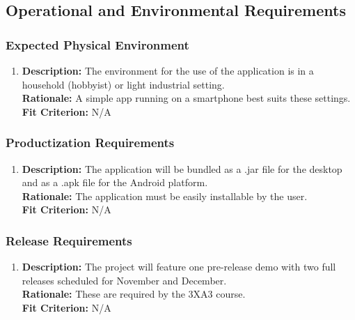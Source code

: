 \documentclass{article}
\begin{document}
\subsection{Operational and Environmental Requirements}
\subsubsection{Expected Physical Environment}
\begin{enumerate}
\item \textbf{Description: } The environment for the use of the application is in a household (hobbyist) or light industrial setting.
\\ \textbf{Rationale: } A simple app running on a smartphone best suits these settings.
\\ \textbf{Fit Criterion:} N/A
\end{enumerate}

\subsubsection{Productization Requirements}
\begin{enumerate}
\item \textbf{Description: } The application will be bundled as a .jar file for the desktop and as a .apk file for the Android platform.
\\ \textbf{Rationale: } The application must be easily installable by the user.
\\ \textbf{Fit Criterion:} N/A
\end{enumerate}

\subsubsection{Release Requirements}
\begin{enumerate}
\item \textbf{Description: } The project will feature one pre-release demo with two full releases scheduled for November and December.
\\ \textbf{Rationale: } These are required by the 3XA3 course.
\\ \textbf{Fit Criterion:} N/A
\end{enumerate}
\end{document}
